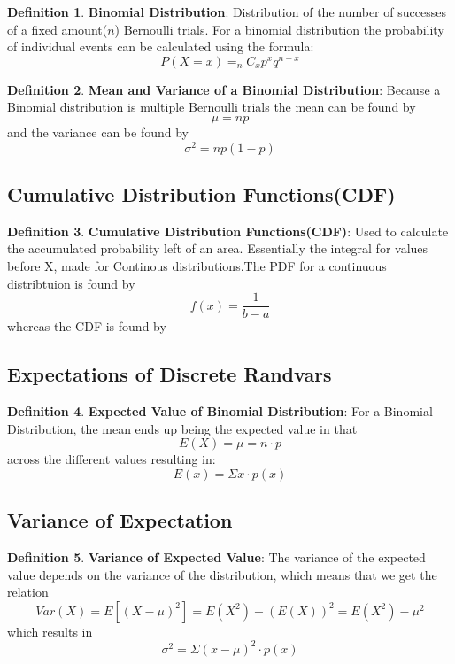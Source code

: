 \documentclass[12pt]{amsart}
\theoremstyle{definition}
\newtheorem{definition}{Definition} %
\numberwithin{equation}{theorem}    %
\begin{document}
\begin{definition}
    \textbf{Binomial Distribution}:
    Distribution of the number of successes of a fixed amount($n$) Bernoulli trials. For a binomial distribution the probability of individual events can be calculated using the formula:
    $$P(X=x) =_nC_x p^xq^{n-x}$$
\end{definition}

\begin{definition}
    \textbf{Mean and Variance of a Binomial Distribution}:
    Because a Binomial distribution is multiple Bernoulli trials the mean can be found by $$\mu = np$$ and the variance can be found by $$\sigma^2 = np(1-p)$$
\end{definition}
 

\subsection*{Cumulative Distribution Functions(CDF)}

\begin{definition}
    \textbf{Cumulative Distribution Functions(CDF)}:
    Used to calculate the accumulated probability left of an area. Essentially the integral for values before X, made for Continous distributions.The PDF for a continuous distribtuion is found by $$f(x) = \frac{1}{b-a}$$ whereas the CDF is found by 

\end{definition}


\subsection*{Expectations of Discrete Randvars}

\begin{definition}
    \textbf{Expected Value of Binomial Distribution}:
    For a Binomial Distribution, the mean ends up being the expected value in that $$E(X) = \mu = n \cdot p$$ across the different values resulting in:
    $$E(x) = \Sigma x \cdot p(x)$$
\end{definition}

\subsection*{Variance of Expectation}

\begin{definition}
    \textbf{Variance of Expected Value}:
    The variance of the expected value depends on the variance of the distribution, which means that we get the relation $$Var(X) = E[(X-\mu)^2] = E(X^2) - (E(X))^2 = E(X^2) - \mu^2$$ which results in $$\sigma^2 = \Sigma(x-\mu)^2 \cdot p(x)$$
\end{definition}
\end{document}
